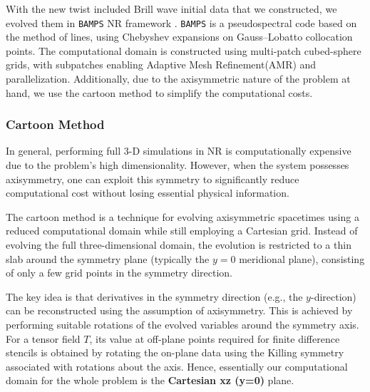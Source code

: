 With the new twist included Brill wave initial data that we constructed, we evolved them in \texttt{BAMPS} NR framework \cite{hilditch_weyhausen_brugmann_2016}. \texttt{BAMPS} is a pseudospectral code based on the method of lines, using Chebyshev expansions on Gauss--Lobatto collocation points. The computational domain is constructed using multi-patch cubed-sphere grids, with subpatches enabling Adaptive Mesh Refinement(AMR) and parallelization. Additionally, due to the axisymmetric nature of the problem at hand, we use the cartoon method to simplify the computational costs.

\subsubsection{Cartoon Method \cite{alcubierre_brgmann_holz_takahashi_brandt_seidel_thornburg_2001}}
\label{Cartoon}

In general, performing full 3-D simulations in NR is computationally expensive due to the problem's high dimensionality. However, when the system possesses axisymmetry, one can exploit this symmetry to significantly reduce computational cost without losing essential physical information.

The cartoon method is a technique for evolving axisymmetric spacetimes using a reduced computational domain while still employing a Cartesian grid. Instead of evolving the full three-dimensional domain, the evolution is restricted to a thin slab around the symmetry plane (typically the $y=0$ meridional plane), consisting of only a few grid points in the symmetry direction.

The key idea is that derivatives in the symmetry direction (e.g., the $y$-direction) can be reconstructed using the assumption of axisymmetry. This is achieved by performing suitable rotations of the evolved variables around the symmetry axis. For a tensor field $T$, its value at off-plane points required for finite difference stencils is obtained by rotating the on-plane data using the Killing symmetry associated with rotations about the axis. Hence, essentially our computational domain for the whole problem is the \textbf{Cartesian xz (y=0)} plane.


